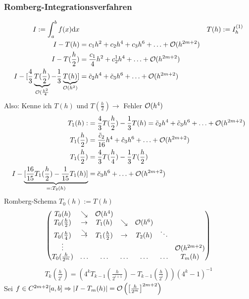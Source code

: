 \subsubsection{Romberg-Integrationsverfahren}
\begin{align*}
  I := \int_a^b f(x) \mathrm{d}x && T(h) := I_h^{(1)}\\
  I-T(h) &= c_1h^2 + c_2h^4+c_3h^6+\ldots+\mathcal{O}(h^{2m+2})\\
  I-T(\frac{h}{2}) &= \frac{c_1}{4} h^2 + c_2^1h^4+\ldots+\mathcal{O}(h^{2m+2})\\
  I-[\frac{4}{3} \underbrace{T(\frac{h}{2})}_{\mathcal{O}(\frac{h^2}{4}} - \frac{1}{3} \underbrace{T(h)}_{\mathcal{O}(h^2)} ] &= \tilde{c}_2h^4 + \tilde{c}_3h^6 + \ldots + \mathcal{O}(h^{2m+2})
\end{align*}
Also: Kenne ich $T(h)$ und $T(\frac{h}{2})\rightarrow$ Fehler $\mathcal{O}(h^4)$
\begin{align*}
  T_1(h) :&= \frac{4}{3} T(\frac{h}{2}) - \frac{1}{3} T(h) = \tilde{c}_2h^4 + \tilde{c}_3h^6 + \ldots + \mathcal{O}(h^{2m+2})\\
  T_1(\frac{h}{2}) &= \frac{\tilde{c}_2}{16} h^4 + \hat{c}_3 h^6 + \ldots + \mathcal{O}(h^{2m+2})\\
  T_1(\frac{h}{2}) &= \frac{4}{3} T(\frac{h}{4}) - \frac{1}{3} T(\frac{h}{2})\\
  I-\underbrace{[\frac{16}{15} T_1(\frac{h}{2}) - \frac{1}{15} T_1(h)]}_{=: T_2(h)} &= \breve{c}_3 h^6 + \ldots + \mathcal{O}(h^{2m+2})
\end{align*}
Romberg-Schema $T_0(h) := T(h)$
\begin{align*}
  \begin{pmatrix}
    T_0(h)                & \searrow    & \LandauO(h^4)    &             &               &           &\\
    T_0(\frac{h}{2})      & \rightarrow & T_1(h)           & \searrow    & \LandauO(h^6) &           &\\
    T_0(\frac{h}{4})      & \esearrow & T_1(\frac{h}{2}) & \rightarrow & T_2(h)        &  \ddots     &\\
    \vdots                &             &                  &             &               &           & \LandauO(h^{2m+2})\\
    T_0(\frac{h}{2^m})    & \ldots      & \ldots           & \ldots      &      \ldots   &  \ldots   & T_m(h) \\ %
  \end{pmatrix}
\end{align*}
\begin{align*}
  T_k\left(\frac{h}{2^i}\right) = \left( 4^k T_{k-1}\left(\frac{h}{2^{i+1}} \right) - T_{k-1}\left(\frac{h}{2^i} \right) \right) \left(4^k-1\right)^{-1}
\end{align*}
 Sei $f \in C^{2m+2}[a,b] \Rightarrow \left| I-T_m(h) \right| = \mathcal{O}\left(\left[\frac{h}{2^m} \right]^{2m+2} \right)$
